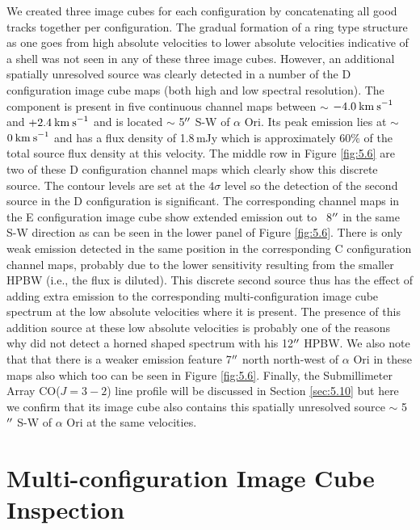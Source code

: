 We created three image cubes for each configuration by concatenating all good tracks together per configuration. The gradual formation of a ring type structure as one goes from high absolute velocities to lower absolute velocities indicative of a shell was not seen in any of these three image cubes. However, an additional spatially unresolved source was clearly detected in a number of the D configuration image cube maps (both high and low spectral resolution). The component is present in five continuous channel maps between $\sim$ $-4.0\>{\rm km\>s}^{-1}$ and $+2.4\>{\rm km\>s}^{-1}$ and is located $\sim$ 5$^{\prime\prime}$ S-W of $\alpha$ Ori. Its peak emission lies at $\sim$ $0\>{\rm km\>s}^{-1}$ and has a flux density of 1.8\,mJy which is approximately 60$\%$ of the total source flux density at this velocity. The middle row in Figure \ref{fig:5.6} are two of these D configuration channel maps which clearly show this discrete source. The contour levels are set at the $4\sigma$ level so the detection of the second source in the D configuration is significant. The corresponding channel maps in the E configuration image cube show extended emission out to ~8$^{\prime\prime}$ in the same S-W direction as can be seen in the lower panel of Figure \ref{fig:5.6}. There is only weak emission detected in the same position in the corresponding C configuration channel maps, probably due to the lower sensitivity resulting from the smaller HPBW (i.e., the flux is diluted). This discrete second source thus has the effect of adding extra emission to the corresponding multi-configuration image cube spectrum at the low absolute velocities where it is present. The presence of this addition source at these low absolute velocities is probably one of the reasons why \cite{huggins_1994} did not detect a horned shaped spectrum with his 12$^{\prime\prime}$ HPBW. We also note that that there is a weaker emission feature 7$^{\prime\prime}$ north north-west of $\alpha$ Ori in these maps also which too can be seen in Figure \ref{fig:5.6}. Finally, the Submillimeter Array CO($J=3-2$) line profile will be discussed in Section \ref{sec:5.10} but here we confirm that its image cube also contains this spatially unresolved source $\sim$ 5$^{\prime\prime}$ S-W of $\alpha$ Ori at the same velocities.

\section{Multi-configuration Image Cube Inspection}\label{sec:5.5}

